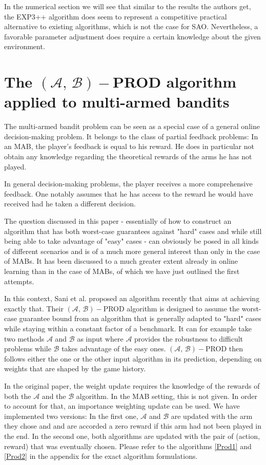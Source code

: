 \documentclass[10.5pt]{article}
\begin{document}
In the numerical section we will see that similar to the results the authors get, the EXP3++ algorithm does seem to represent a competitive practical alternative to existing algorithms, which is not the case for SAO. Nevertheless, a favorable parameter adjustment does require a certain knowledge about the given environment.


\section*{The $(\mathcal{A},\, \mathcal{B})-$PROD algorithm applied to multi-armed bandits}

The multi-armed bandit problem can be seen as a special case of a general online decision-making problem. It belongs to the class of partial feedback problems: In an MAB, the player's feedback is equal to his reward. He does in particular not obtain any knowledge regarding the theoretical rewards of the arms he has not played.

In general decision-making problems, the player receives a more comprehensive feedback. One notably assumes that he has access to the reward he would have received had he taken a different decision.

The question discussed in this paper - essentially of how to construct an algorithm that has both worst-case guarantees against "hard" cases and while still being able to take advantage of "easy" cases - can obviously be posed in all kinds of different scenarios and is of a much more general interest than only in the case of MABs. It has been discussed to a much greater extent already in online learning than in the case of MABs, of which we have just outlined the first attempts.

In this context, Sani et al. \cite{Sani14} proposed an algorithm recently that aims at achieving exactly that. Their $(\mathcal{A},\, \mathcal{B})-$PROD algorithm is designed to assume the worst-case guarantee bound from an algorithm that is generally adapted to "hard" cases while staying within a constant factor of a benchmark. It can for example take two methods $\mathcal{A}$ and $\mathcal{B}$ as input where $\mathcal{A}$ provides the robustness to difficult problems while $\mathcal{B}$  takes advantage of the easy ones. $(\mathcal{A},\, \mathcal{B})-$PROD then follows either the one or the other input algorithm in its prediction, depending on weights that are shaped by the game history.

In the original paper, the weight update requires the knowledge of the rewards of both the $\mathcal{A}$ and the $\mathcal{B}$ algorithm. In the MAB setting, this is not given. In order to account for that, an importance weighting update can be used. We have implemented two versions: In the first one, $\mathcal{A}$ and $\mathcal{B}$  are updated with the arm they chose and and are accorded a zero reward if this arm had not been played in the end. In the second one, both algorithms are updated with the pair of (action, reward) that was eventually chosen. Please refer to the algorithms \ref{Prod1} and \ref{Prod2} in the appendix for the exact algorithm formulations.
\end{document}
